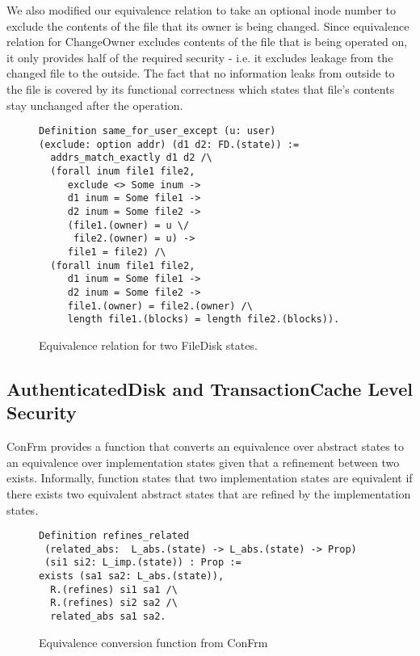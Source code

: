 We also modified our equivalence relation to take an optional inode number to exclude the contents of the file that its owner is being changed.
Since equivalence relation for ChangeOwner excludes contents of the file that is being operated on, it only provides half of the required security - i.e. it excludes leakage from the changed file to the outside. The fact that no information leaks from outside to the file is covered by its functional correctness which states that file's contents stay unchanged after the operation.

\begin{figure}[ht]
    \centering
\begin{verbatim}
Definition same_for_user_except (u: user) 
(exclude: option addr) (d1 d2: FD.(state)) :=
  addrs_match_exactly d1 d2 /\
  (forall inum file1 file2,
     exclude <> Some inum ->
     d1 inum = Some file1 ->
     d2 inum = Some file2 ->
     (file1.(owner) = u \/
      file2.(owner) = u) ->
     file1 = file2) /\
  (forall inum file1 file2,
     d1 inum = Some file1 ->
     d2 inum = Some file2 ->
     file1.(owner) = file2.(owner) /\ 
     length file1.(blocks) = length file2.(blocks)).
\end{verbatim}
    \caption{Equivalence relation for two FileDisk states.}
    \label{fig:eqivalence_for_filedisk}
\end{figure}



\subsection{AuthenticatedDisk and TransactionCache Level Security}
ConFrm provides a function that converts an equivalence over abstract states to an equivalence over implementation states given that a refinement between two exists. Informally, function states that two implementation states are equivalent if there exists two equivalent abstract states that are refined by the implementation states.

\begin{figure}[ht]
    \centering
\begin{verbatim}
Definition refines_related 
 (related_abs:  L_abs.(state) -> L_abs.(state) -> Prop)
 (si1 si2: L_imp.(state)) : Prop :=
exists (sa1 sa2: L_abs.(state)),
  R.(refines) si1 sa1 /\
  R.(refines) si2 sa2 /\
  related_abs sa1 sa2.
\end{verbatim}
    \caption{Equivalence conversion function from ConFrm}
    \label{fig:refines_related}
\end{figure}

